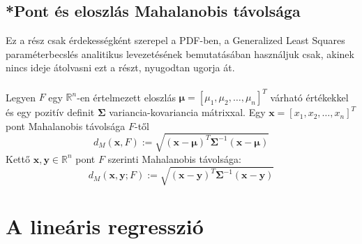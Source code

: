 \documentclass[14p]{report}
\def\pmb{\boldsymbol}
\begin{document}
	\section{*Pont és eloszlás Mahalanobis távolsága}
	Ez a rész csak érdekességként szerepel a PDF-ben, a Generalized Least Squares paraméterbecslés analitikus levezetésének bemutatásában használjuk csak, akinek nincs ideje átolvasni ezt a részt, nyugodtan ugorja át.
	\\
	\\
	Legyen $F$ egy $\mathbb{R}^{n}$-en értelmezett eloszlás $\pmb{\mu} = [\mu_1, \mu_2, \dots, \mu_n]^T$ várható értékekkel és egy pozitív definit $\pmb{\Sigma}$ variancia-kovariancia mátrixxal. Egy $\pmb{x} = [x_1, x_2, \dots, x_n]^T$ pont Mahalanobis távolsága $F$-től
	\[
		d_M(\pmb{x}, F) := \sqrt{(\pmb{x} - \pmb{\mu})^T\pmb{\Sigma}^{-1}(\pmb{x} - \pmb{\mu})}
	\]
	Kettő $\pmb{x}, \pmb{y} \in \mathbb{R}^n$ pont $F$ szerinti Mahalanobis távolsága:
	\[
		d_M(\pmb{x}, \pmb{y}; F) := \sqrt{(\pmb{x} - \pmb{y})^T\pmb{\Sigma}^{-1}(\pmb{x} - \pmb{y})}
	\]
	\chapter{A lineáris regresszió}
\end{document}
